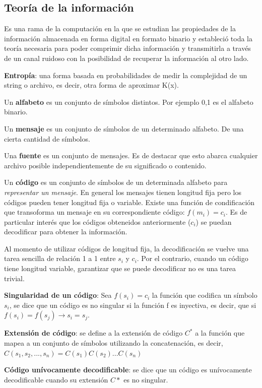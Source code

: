 \documentclass[titlepage,a4paper]{article}
\begin{document}
\subsection*{Teoría de la información}
Es una rama de la computación en la que se estudian las propiedades de la información almacenada en forma digital en formato binario y estableció toda la teoría necesaria para poder comprimir dicha información y transmitirla a través de un canal ruidoso con la posibilidad de recuperar la información al otro lado. 

\textbf{Entropía}: una forma basada en probabilidades de medir la complejidad de un string o archivo, es decir, otra forma de aproximar K(x). 

Un \textbf{alfabeto} es un conjunto de símbolos distintos. Por ejemplo {0,1} es el alfabeto binario. 

Un \textbf{mensaje} es un conjunto de símbolos de un determinado alfabeto. De una cierta cantidad de símbolos. 

Una \textbf{fuente} es un conjunto de mensajes. Es de destacar que esto abarca cualquier archivo posible independientemente de su significado o contenido. 

Un \textbf{código} es un conjunto de símbolos de un determinada alfabeto para \textit{representar un mensaje}. En general los mensajes tienen longitud fija pero los códigos pueden tener longitud fija o variable. Existe una función de condificación que transoforma un mensaje en su correspondiente código: $f(m_i) = c_i$. Es de particular interés que los códigos obteneidos anteriormente ($c_i$) se puedan decodificar para obtener la información.

Al momento de utilizar códigos de longitud fija, la decodificación se vuelve una tarea sencilla de relación 1 a 1 entre $s_i$ y $c_i$. Por el contrario, cuando un código tiene longitud variable, garantizar que se puede decodificar no es una tarea trivial. 

\textbf{Singularidad de un código}: Sea $f(s_i) = c_i$ la función que codifica un símbolo $s_i$, se dice que un código es no singular si la función f es inyectiva, es decir, que si $f(s_i) = f(s_j) \rightarrow s_i = s_j $. 

\textbf{Extensión de código}: se define a la extensión de código $C^*$ a la función que mapea a un conjunto de símbolos utilizando la concatenación, es decir, $C(s_1,s_2,...,s_n) = C(s_1) C(s_2) ... C(s_n)$

\textbf{Código unívocamente decodificable}: se dice que un código es unívocamente decodificable cuando su extensión $C*$ es no singular. 
\end{document}
